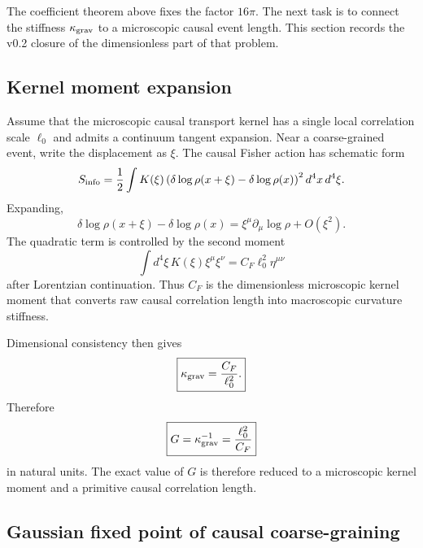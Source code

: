 \documentclass[11pt]{article}
\begin{document}
The coefficient theorem above fixes the factor $16\pi$. The next task is to connect the stiffness $\kappa_{\rm grav}$ to a microscopic causal event length. This section records the v0.2 closure of the dimensionless part of that problem.

\subsection{Kernel moment expansion}

Assume that the microscopic causal transport kernel has a single local correlation scale $\ell_0$ and admits a continuum tangent expansion. Near a coarse-grained event, write the displacement as $\xi$. The causal Fisher action has schematic form
\begin{equation}
S_{\rm info}=\frac12\int K(\xi)\left(\delta\log\rho(x+\xi)-\delta\log\rho(x)\right)^2d^4x\,d^4\xi.
\end{equation}
Expanding,
\begin{equation}
\delta\log\rho(x+\xi)-\delta\log\rho(x)=\xi^\mu\partial_\mu\log\rho+O(\xi^2).
\end{equation}
The quadratic term is controlled by the second moment
\begin{equation}
\int d^4\xi\,K(\xi)\xi^\mu\xi^\nu=C_F\ell_0^2\eta^{\mu\nu}
\end{equation}
after Lorentzian continuation. Thus $C_F$ is the dimensionless microscopic kernel moment that converts raw causal correlation length into macroscopic curvature stiffness.

Dimensional consistency then gives
\begin{equation}
\boxed{\kappa_{\rm grav}=\frac{C_F}{\ell_0^2}.}
\end{equation}
Therefore
\begin{equation}
\boxed{G=\kappa_{\rm grav}^{-1}=\frac{\ell_0^2}{C_F}}
\end{equation}
in natural units. The exact value of $G$ is therefore reduced to a microscopic kernel moment and a primitive causal correlation length.

\subsection{Gaussian fixed point of causal coarse-graining}
\end{document}
